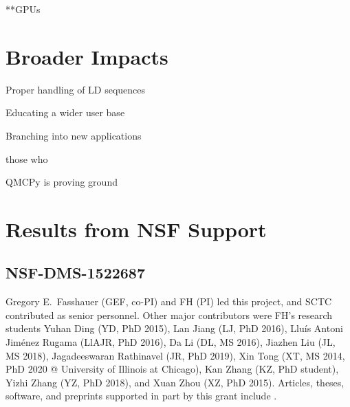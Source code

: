 \documentclass[11pt]{NSFamsart}
\begin{document}

**GPUs






\section{Broader Impacts}

Proper handling of LD sequences 

Educating a wider user base

Branching into new applications

those who

QMCPy is proving ground














\section{Results from NSF Support} \label{sec:prior_work}

\subsection{NSF-DMS-1522687
} \label{sec:Previous}

Gregory E.\ Fasshauer (GEF, co-PI) and FH (PI) led this project, and SCTC contributed as senior personnel.  Other major contributors were FH's research students Yuhan Ding (YD, PhD 2015), Lan Jiang (LJ, PhD 2016), 
Llu\'is Antoni Jim\'enez Rugama (LlAJR, PhD 2016), Da Li (DL, MS 2016), Jiazhen Liu (JL, MS 2018), Jagadeeswaran Rathinavel (JR, 
PhD 2019), Xin Tong (XT, MS 2014, PhD 2020 @ University of Illinois at Chicago), Kan Zhang (KZ, PhD student), Yizhi Zhang (YZ, PhD 2018), and Xuan Zhou (XZ, PhD 2015).  Articles, theses,  
software, and preprints supported in 
part by this 
grant 
include 
\cite{ala_augmented_2017, 
	ChoEtal17a,
	ChoEtal20a,
	Din15a, 
	DinHic20a,
	GilEtal16a,
	Hic17a,
	HicJag18b,
	HicJim16a,
	HicEtal18a,
	HicEtal17a,
	HicKriWoz19a,
	RatHic19a,
	GilJim16b,
	JimHic16a,
	JohFasHic18a,
	Li16a,
	Liu17a,
	MarEtal18a,
	mccourt_stable_2017,
	MCCEtal19a,
	mishra_hybrid_2018,
	MisEtal19a,
	rashidinia_stable_2016,
	rashidinia_stable_2018,
	Zha18a,
	Zha17a,
	Zho15a,
	ZhoHic15a}.
\end{document}
